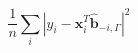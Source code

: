 \documentclass[10pt]{article}
\begin{document}
\[\frac{1}{n}\sum_i \left| y_i - \boldsymbol{x}_i^T \boldsymbol{\hat{b}}_{-i,\Gamma} \right|^2
\]
\end{document}

